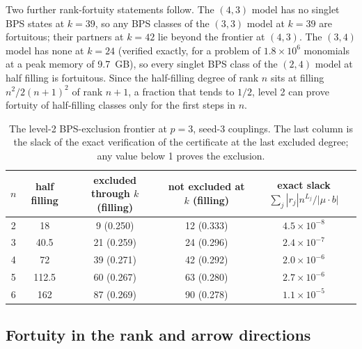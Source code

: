 \documentclass[10pt]{article}
\begin{document}
Two further rank-fortuity statements follow. The $(4,3)$ model has no singlet BPS states at $k=39$, so any BPS classes
of the $(3,3)$ model at $k=39$ are fortuitous; their partners at $k=42$ lie beyond the frontier at $(4,3)$. The $(3,4)$
model has none at $k=24$ (verified exactly, for a problem of $1.8\times10^6$ monomials at a peak memory of 9.7~GB), so
every singlet BPS class of the $(2,4)$ model at half filling is fortuitous. Since the half-filling degree of rank $n$
sits at filling $n^2/2(n+1)^2$ of rank $n+1$, a fraction that tends to $1/2$, level 2 can prove fortuity of
half-filling classes only for the first steps in $n$.

\begin{table}[t]\centering\small
\begin{tabular}{ccccc}
\toprule
$n$ & half filling & excluded through $k$ (filling) & not excluded at $k$ (filling) & exact slack $\sum_j|r_j|n^{L_j}/|\mu\cdot b|$\\
\midrule
2 & 18 & 9 (0.250) & 12 (0.333) & $4.5\times10^{-8}$\\
3 & 40.5 & 21 (0.259) & 24 (0.296) & $2.4\times10^{-7}$\\
4 & 72 & 39 (0.271) & 42 (0.292) & $2.0\times10^{-6}$\\
5 & 112.5 & 60 (0.267) & 63 (0.280) & $2.7\times10^{-6}$\\
6 & 162 & 87 (0.269) & 90 (0.278) & $1.1\times10^{-5}$\\
\bottomrule
\end{tabular}
\caption{The level-2 BPS-exclusion frontier at $p=3$, seed-3 couplings. The last column is the slack of the exact
verification of the certificate at the last excluded degree; any value below 1 proves the exclusion.}
\label{tab:frontier}
\end{table}

\subsection{Fortuity in the rank and arrow directions}\label{sec:towers}
\end{document}
